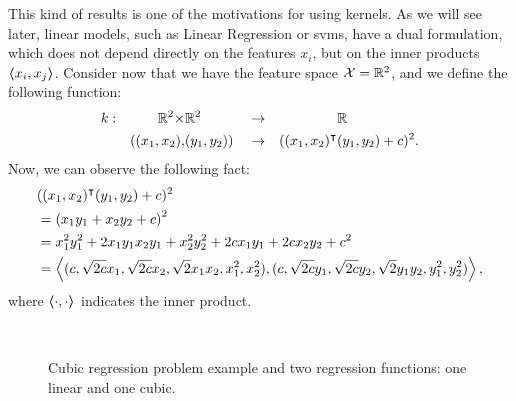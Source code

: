 This kind of results is one of the motivations for using kernels. 
As we will see later, linear models, such as Linear Regression or \acrshort{svms}, have a dual formulation, which does not depend directly on the features $x_i$, but on the inner products $\bm{\left\langle} x_i, x_j \bm{\right\rangle}$.
Consider now that we have the feature space $\mathcal{X} = \mathbb{R}^2$, and we define the following function:
\begin{equation}
    \begin{aligned}
        \nonumber
        k: & &\mathbb{R}^2 \times &\mathbb{R}^2 & &\to& &\mathbb{R} \\
        & &((x_1, x_2), & (y_1, y_2))   & &\to& ((x_1, x_2)^\intercal &(y_1, y_2) + c)^2 .
    \end{aligned}
\end{equation}
Now, we can observe the following fact:
\begin{equation}
    \nonumber
    \begin{aligned}
        &((x_1, x_2)^\intercal (y_1, y_2) + c)^2 \\
        &= \left(x_1 y_1 + x_2 y_2 + c \right)^2 \\
        &= x_1^2 y_1^2 + 2 x_1 y_1 x_2 y_1+ x_2^2 y_2^2 + 2 c x_1 y_1 + 2 c x_2 y_2 + c^2 \\
        &= \bm{\left\langle} (c, \sqrt{2c} x_1, \sqrt{2c} x_2, \sqrt{2} x_1 x_2, x_1^2, x_2^2), (c, \sqrt{2c} y_1, \sqrt{2c} y_2, \sqrt{2} y_1 y_2, y_1^2, y_2^2) \bm{\right\rangle},
    \end{aligned}
\end{equation}
where $\bm{\left\langle} \cdot, \cdot \bm{\right\rangle}$ indicates the inner product.
%
\begin{figure}[t!]
    \centering
    \quad%
    \quad
    \\
    \caption{Cubic regression problem example and two regression functions: one linear and one cubic.}
    \label{fig:cubicreg}
\end{figure}
